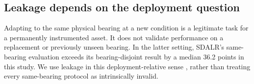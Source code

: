 \subsection{Leakage depends on the deployment question}

Adapting to the same physical bearing at a new condition is a legitimate task for a permanently instrumented asset. It does not validate performance on a replacement or previously unseen bearing. In the latter setting, SDALR's same-bearing evaluation exceeds its bearing-disjoint result by a median 36.2 points in this study. We use leakage in this deployment-relative sense \cite{kapoor2023leakage}, rather than treating every same-bearing protocol as intrinsically invalid.
